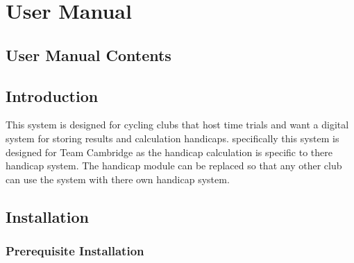 \chapter{User Manual}
\startcontents[UserManual]
\section{User Manual Contents}


\section{Introduction}
This system is designed for cycling clubs that host time trials and want a digital system for storing results and calculation handicaps. specifically  this system is designed for Team Cambridge as the handicap calculation is specific to there handicap system. The handicap module can be replaced so that any other club can use the system with there own handicap system.
\section{Installation}

\subsection{Prerequisite Installation}

